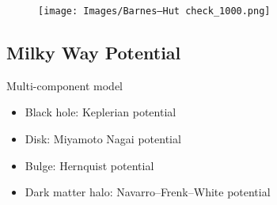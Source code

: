 \documentclass{beamer}
\begin{document}
\begin{frame}
\begin{figure}
\centering
\texttt{[image: Images/Barnes–Hut check\_1000.png]}
\end{figure}
\end{frame}


\subsection{Milky Way Potential}

\begin{frame}

Multi-component model

\begin{itemize}
\item Black hole: Keplerian potential
\item Disk: Miyamoto Nagai potential
\item Bulge: Hernquist potential
\item Dark matter halo: Navarro–Frenk–White potential
\end{itemize}


\end{frame}
\end{document}
